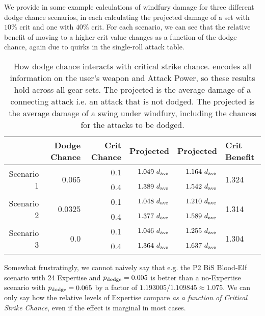 We provide in  some example calculations of windfury damage for three different dodge chance scenarios, in each calculating the projected damage of a set with $10\%$ crit and one with $40\%$ crit.
For each scenario, we can see that the relative benefit of moving to a higher crit value changes as a function of the dodge chance, again due to quirks in the single-roll attack table.

\begin{table}[htb]
	\centering
	\begin{tabular}{ r | r | r | r | r | l }
		  \multicolumn{1}{c|}{}  & Dodge Chance & Crit Chance & Projected \dphys & Projected \dwf & Crit Benefit \\
		\hline \hline
		\multirow{2}{*}{Scenario 1}	 &	\multirow{2}{*}{0.065} & 0.1 & $1.049~d_{\mathrm{ave}} $ & $1.164~d_{\mathrm{ave}} $ & \multirow{2}{*}{1.324} \\
					&  & 0.4 & $1.389~d_{\mathrm{ave}} $ & $1.542~d_{\mathrm{ave}} $ & \\
		\hline
		
		\multirow{2}{*}{Scenario 2}	 &	\multirow{2}{*}{0.0325} & 0.1 & $1.048~d_{\mathrm{ave}} $ & $1.210~d_{\mathrm{ave}} $ & \multirow{2}{*}{1.314} \\
		&  & 0.4 & $1.377~d_{\mathrm{ave}} $ & $1.589~d_{\mathrm{ave}} $ & \\
		\hline
		
		\multirow{2}{*}{Scenario 3}	 &	\multirow{2}{*}{0.0} & 0.1 & $1.046~d_{\mathrm{ave}} $ & $1.255~d_{\mathrm{ave}} $ & \multirow{2}{*}{1.304} \\
		&  & 0.4 & $1.364~d_{\mathrm{ave}} $ & $1.637~d_{\mathrm{ave}} $ & \\
		\hline
		
	\end{tabular}
	\caption{How dodge chance interacts with critical strike chance.
		\dave encodes all information on the user's weapon and Attack Power, so these results hold across all gear sets.
	The projected \dphys is the average damage of a connecting attack i.e. an attack that is not dodged.
	The projected \dwf is the average damage of a swing under windfury, including the chances for the attacks to be dodged.}		
	\label{tab:wfautos}
\end{table}

Somewhat frustratingly, we cannot naively say that e.g. the P2 BiS Blood-Elf scenario with 24 Expertise and $p_{\mathrm{dodge}}  = 0.005$ is better than a no-Expertise scenario with $p_{\mathrm{dodge}}  = 0.065$ by a factor of $1.193005/1.109845 \approx 1.075$.
We can only say how the relative levels of Expertise compare \emph{as a function of Critical Strike Chance}, even if the effect is marginal in most cases.

